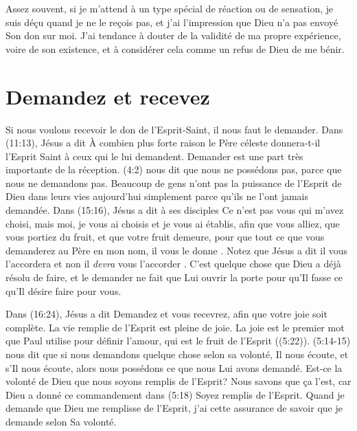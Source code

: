 Assez souvent, si je m'attend à un type spécial de réaction ou de sensation,
 je suis déçu quand je ne le reçois pas, et j'ai l'impression que Dieu
 n'a pas envoyé Son don sur moi. J'ai tendance à douter de la validité
 de ma propre expérience, 
 voire de son existence, et à considérer cela
 comme un refus de Dieu de me bénir.


\section{Demandez et recevez}

Si nous voulons recevoir le don de l'Esprit-Saint,
 il nous faut le demander. Dans (11:13), Jésus a dit\frcolon{}
 \Og À combien plus forte raison le Père céleste donnera-t-il
 l'Esprit Saint à ceux qui le lui demandent. \Fg{}
 Demander est une part très importante de la réception.
 (4:2) nous dit que nous ne possédons pas,
 parce que nous ne demandons pas. Beaucoup de gens n'ont pas
 la puissance de l'Esprit de Dieu dans leurs vies aujourd'hui
 simplement parce qu'ils ne l'ont jamais demandée.
 Dans (15:16), Jésus a dit à ses disciples\frcolon{}
 \Og Ce n'est pas vous qui m'avez choisi, mais moi,
 je vous ai choisis et je vous ai établis, afin que vous alliez,
 que vous portiez du fruit, et que votre fruit demeure,
 pour que tout ce que vous demanderez au Père en mon nom,
 il vous le donne . \Fg{}
 Notez que Jésus a dit\frcolon{} \Og il vous l'accordera \Fg{} et non
 \Og il \emph{devra} vous l'accorder \Fg{}.
 C'est quelque chose que Dieu a déjà résolu de faire,
 et le demander ne fait que Lui ouvrir la porte pour qu'Il fasse
 ce qu'Il désire faire pour vous.

Dans (16:24), Jésus a dit\frcolon{}
 \Og Demandez et vous recevrez, afin que votre joie soit complète. \Fg{}
 La vie remplie de l'Esprit est pleine de joie.
 La joie est le premier mot que Paul utilise pour définir l'amour,
 qui est le fruit de l'Esprit ((5:22)).
 (5:14-15) nous dit que si nous demandons quelque chose
 selon sa volonté, Il nous écoute, et s'Il nous écoute,
 alors nous possédons ce que nous Lui avons demandé.
 Est-ce la volonté de Dieu que nous soyons remplis de l'Esprit?
 Nous savons que ça l'est, car Dieu a donné ce commandement dans
 (5:18)\frcolon{} \Og Soyez remplis de l'Esprit. \Fg{}
 Quand je demande que Dieu me remplisse de l'Esprit,
 j'ai cette assurance de savoir que je demande selon Sa volonté.

